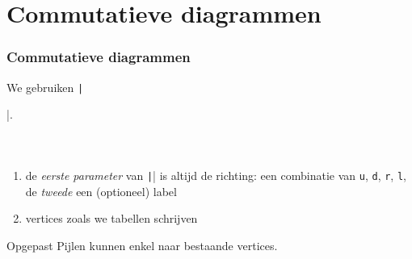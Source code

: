 \section{Commutatieve diagrammen}

\begin{frame}[fragile]
  \frametitle{Commutatieve diagrammen}

  \small
  We gebruiken \texttt|\usepackage{tikz-cd}|.
  \begin{columns}
    \begin{column}{.67\textwidth}
      \inputminted[fontsize = \scriptsize]{latex}{tikz/diagrams/1.tikz}
    \end{column}
    \begin{column}{.33\textwidth}
      
    \end{column}
  \end{columns}
  \small
  \begin{enumerate}
    \item\pause de \emph{eerste parameter} van \texttt|\arrow| is altijd de richting: een combinatie van \texttt{u}, \texttt{d}, \texttt{r}, \texttt{l}, de \emph{tweede} een (optioneel) label
    \item\pause vertices zoals we tabellen schrijven 
  \end{enumerate}
  \begin{alertblock}{Opgepast}
    \dbend\quad Pijlen kunnen enkel naar bestaande vertices.
  \end{alertblock}
\end{frame}


